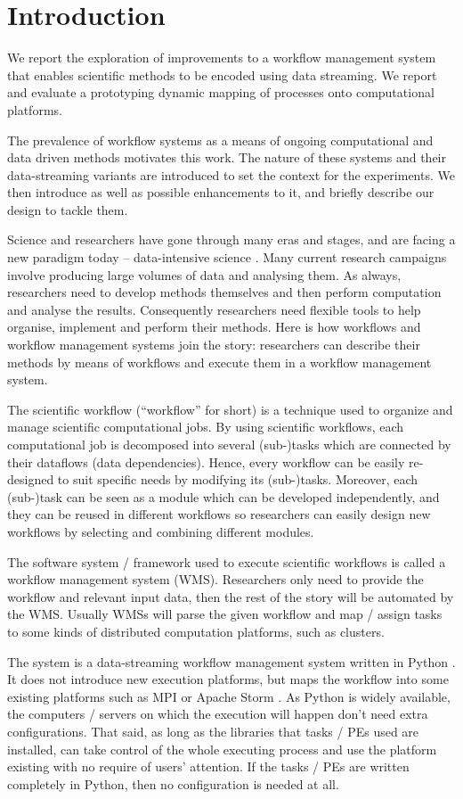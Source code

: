 \chapter{Introduction}
We report the exploration of improvements to a workflow management system that enables scientific methods to be encoded using data streaming. We report and evaluate a prototyping dynamic mapping of processes onto computational platforms.

The prevalence of workflow systems as a means of ongoing computational and data driven methods motivates this work. The nature of these systems and their data-streaming variants are introduced to set the context for the experiments. We then introduce \dpy as well as possible enhancements to it, and briefly describe our design to tackle them.

Science and researchers have gone through many eras and stages, and are facing a new paradigm today -- data-intensive science \cite{hey2009fourth}. Many current research campaigns involve producing large volumes of data and analysing them. As always, researchers need to develop methods themselves and then perform computation and analyse the results. Consequently researchers need flexible tools to help organise, implement and perform their methods. Here is how workflows and workflow management systems join the story: researchers can describe their methods by means of workflows and execute them in a workflow management system.

The scientific workflow (``workflow'' for short) is a technique used to organize and manage scientific computational jobs. By using scientific workflows, each computational job is decomposed into several (sub-)tasks which are connected by their dataflows (data dependencies). Hence, every workflow can be easily re-designed to suit specific needs by modifying its (sub-)tasks. Moreover, each (sub-)task can be seen as a module which can be developed independently, and they can be reused in different workflows so researchers can easily design new workflows by selecting and combining different modules.

The software system / framework used to execute scientific workflows is called a workflow management system (WMS). Researchers only need to provide the workflow and relevant input data, then the rest of the story will be automated by the WMS. Usually WMSs will parse the given workflow and map / assign tasks to some kinds of distributed computation platforms, such as clusters.

The \dpy system is a data-streaming workflow management system written in Python \cite{doi:10.1177/1094342016649766}. It does not introduce new execution platforms, but maps the workflow into some existing platforms such as MPI \cite{MPI_forum} or Apache Storm \cite{apache_storm}. As Python is widely available, the computers / servers on which the execution will happen don't need extra configurations. That said, as long as the libraries that tasks / PEs used are installed, \dpy can take control of the whole executing process and use the platform existing with no require of users' attention. If the tasks / PEs are written completely in Python, then no configuration is needed at all.

